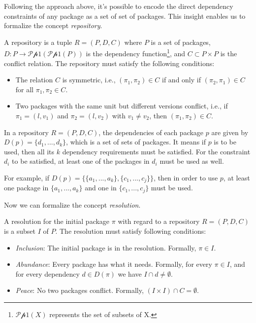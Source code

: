 Following the approach above, it's possible to encode the direct dependency constraints of any package as a set of set of packages. This insight enables us to formalize the concept \emph{repository}\cite{mancinelli2006managing}.

\begin{definition}[Repository]
  A repository is a tuple $R = (P, D, C)$ where $P$ is a set of packages, $D : P \rightarrow \mathscr{P p 1}(\mathscr{P p 1}(P))$ is the dependency function\footnote{$\mathscr{P p 1}(X)$ represents the set of subsets of X.}, and $C \subset P \times P$ is the conflict relation. The repository must satisfy the following conditions:

  \begin{itemize}
  \item The relation $C$ is symmetric, i.e., $(\pi_1, \pi_2) \in C$ if and only if $(\pi_2, \pi_1) \in C$ for all $\pi_1, \pi_2 \in C$.
  \item Two packages with the same unit but different versions conflict, i.e., if $\pi_1 = (l, v_1)$ and $\pi_2 = (l, v_2)$ with $v_1 \neq v_2$, then $(\pi_1, \pi_2) \in C$.
  \end{itemize}
\end{definition}

In a repository $R = (P, D, C)$, the dependencies of each package $p$ are given by $D(p) = \{d_1, ..., d_k\}$, which is a set of sets of packages. It means if $p$ is to be used, then all its $k$ dependency requirements must be satisfied. For the constraint $d_i$ to be satisfied, at least one of the packages in $d_i$ must be used as well.

For example, if $D(p) = \{\{a_1, ..., a_k\}, \{c_1, ..., c_j\}\}$, then in order to use $p$, at least one package in $\{a_1, ..., a_k\}$ and one in $\{c_1, ..., c_j\}$ must be used.

Now we can formalize the concept \emph{resolution}.

\begin{definition}[Resolution]
  A resolution for the initial package $\pi$ with regard to a repository $R = (P, D, C)$ is a subset $I$ of $P$. The resolution must satisfy following conditions:

  \begin{itemize}
  \item \emph{Inclusion}: The initial package is in the resolution. Formally, $\pi \in I$.
  \item \emph{Abundance}: Every package has what it needs. Formally, for every $\pi \in I$, and for every dependency $d \in D(\pi)$ we have $I \cap d \neq \emptyset$.
  \item \emph{Peace}: No two packages conflict. Formally, $(I \times I) \cap C = \emptyset$.
  \end{itemize}
\end{definition}

